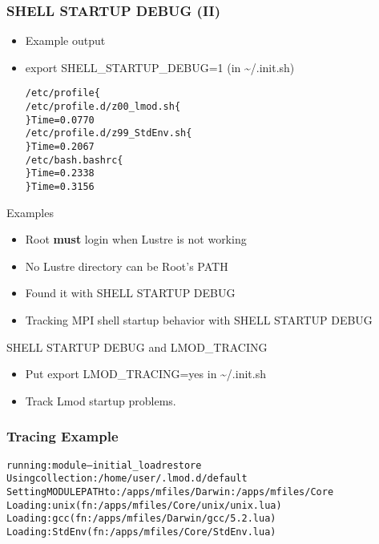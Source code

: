 \documentclass[dvipsnames,aspectratio=169]{beamer}
\begin{document}
\begin{frame}[fragile]
    \frametitle{SHELL STARTUP DEBUG (II)}
  \begin{itemize}
    \item Example output
    \item export SHELL\_STARTUP\_DEBUG=1 (in \textasciitilde/.init.sh)
  {\small
    \begin{alltt}
    /etc/profile\{
      /etc/profile.d/z00\_lmod.sh\{
      \} Time = 0.0770
      /etc/profile.d/z99\_StdEnv.sh\{
      \} Time = 0.2067
      /etc/bash.bashrc\{
      \} Time = 0.2338
    \} Time = 0.3156
    \end{alltt}
}
  \end{itemize}
\end{frame}

\begin{frame}{Examples}
  \begin{itemize}
    \item Root \textbf{must} login when Lustre is not working
    \item No Lustre directory can be Root's PATH
    \item Found it with SHELL STARTUP DEBUG
    \item Tracking MPI shell startup behavior with SHELL STARTUP DEBUG
  \end{itemize}
\end{frame}

\begin{frame}{SHELL STARTUP DEBUG and LMOD\_TRACING}
  \begin{itemize}
    \item Put export LMOD\_TRACING=yes in \textasciitilde/.init.sh
    \item Track Lmod startup problems.
  \end{itemize}
\end{frame}


\begin{frame}[fragile]
    \frametitle{Tracing Example}
  {\small
    \begin{alltt}
running: module --initial_load restore
  Using collection:      /home/user/.lmod.d/default
  Setting MODULEPATH to: /apps/mfiles/Darwin:/apps/mfiles/Core
  Loading: unix (fn: /apps/mfiles/Core/unix/unix.lua)
  Loading: gcc (fn: /apps/mfiles/Darwin/gcc/5.2.lua)
  Loading: StdEnv (fn: /apps/mfiles/Core/StdEnv.lua)
    \end{alltt}
}
\end{frame}
\end{document}
